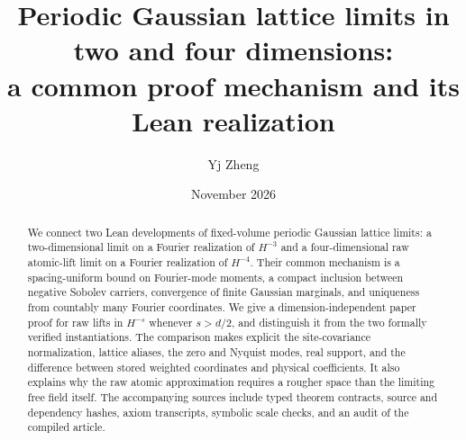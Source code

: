 \documentclass[11pt]{amsart}
\title[Periodic Gaussian limits in two and four dimensions]{Periodic Gaussian lattice limits in two and four dimensions:\\a common proof mechanism and its Lean realization}
\author{Yj Zheng}
\date{November 2026}
\theoremstyle{definition}\newtheorem{definition}[theorem]{Definition}
\theoremstyle{remark}\newtheorem{remark}[theorem]{Remark}
\begin{document}
\begin{abstract}
We connect two Lean developments of fixed-volume periodic Gaussian lattice
limits: a two-dimensional limit on a Fourier realization of $H^{-3}$ and a
four-dimensional raw atomic-lift limit on a Fourier realization of $H^{-4}$.
Their common mechanism is a spacing-uniform bound on Fourier-mode moments,
a compact inclusion between negative Sobolev carriers, convergence of finite
Gaussian marginals, and uniqueness from countably many Fourier coordinates.
We give a dimension-independent paper proof for raw lifts in $H^{-s}$ whenever
$s>d/2$, and distinguish it from the two formally verified instantiations.
The comparison makes explicit the site-covariance normalization, lattice
aliases, the zero and Nyquist modes, real support, and the difference between
stored weighted coordinates and physical coefficients. It also explains why
the raw atomic approximation requires a rougher space than the limiting free
field itself. The accompanying sources include typed theorem contracts,
source and dependency hashes, axiom transcripts, symbolic scale checks, and
an audit of the compiled article.
\end{abstract}
\maketitle
\tableofcontents






\clearpage
\appendix

\clearpage

\end{document}
